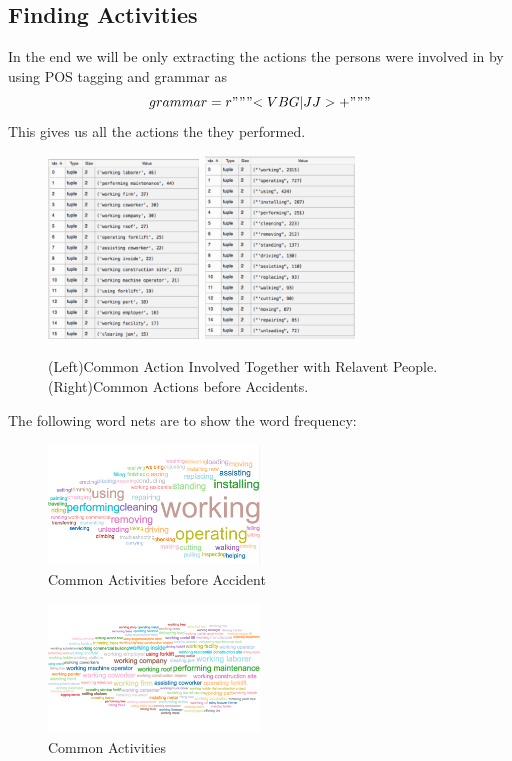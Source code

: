 \documentclass[DIV=calc, paper=a4, fontsize=11pt, twocolumn]{scrartcl}	 %
\begin{document}
\subsection{Finding Activities}
In the end we will be only extracting the actions the persons were involved in by using
POS tagging and grammar as
$$grammar = r"""{<VBG|JJ>+}"""$$
This gives us all the actions the they performed.


\begin{figure}%
    \centering
    \includegraphics[width=4cm]{q41.png}
    \includegraphics[width=4cm]{q42.png}
    \caption{(Left)Common Action Involved Together with Relavent
      People. (Right)Common Actions before Accidents.}%
\end{figure}


The following word nets are to show the word frequency:

\begin{figure}[h!]
  \centering
      \includegraphics[width=0.5\textwidth]{bef_acc.png}
   \caption{Common Activities before Accident}
\end{figure}


\begin{figure}[h!]
  \centering
      \includegraphics[width=0.5\textwidth]{act.png}
   \caption{Common Activities}
\end{figure}
\end{document}
